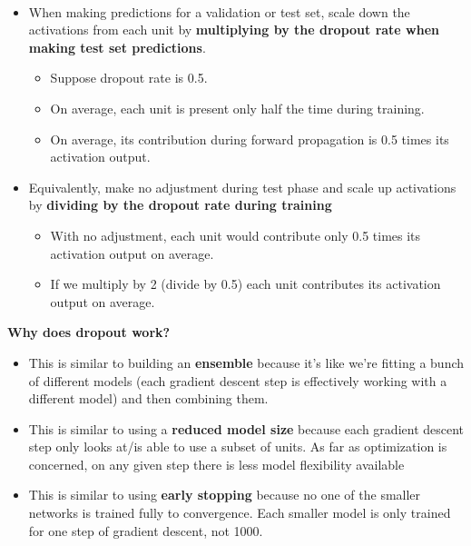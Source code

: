 \documentclass[11pt]{article}
\providecommand{\tightlist}{%
      \setlength{\itemsep}{0pt}\setlength{\parskip}{0pt}}
\begin{document}
    \begin{center}
    \end{center}
    { \hspace*{\fill} \\}
    
    \begin{itemize}
\tightlist
\item
  When making predictions for a validation or test set, scale down the
  activations from each unit by \textbf{multiplying by the dropout rate
  when making test set predictions}.

  \begin{itemize}
  \tightlist
  \item
    Suppose dropout rate is 0.5.
  \item
    On average, each unit is present only half the time during training.
  \item
    On average, its contribution during forward propagation is 0.5 times
    its activation output.
  \end{itemize}
\item
  Equivalently, make no adjustment during test phase and scale up
  activations by \textbf{dividing by the dropout rate during training}

  \begin{itemize}
  \tightlist
  \item
    With no adjustment, each unit would contribute only 0.5 times its
    activation output on average.
  \item
    If we multiply by 2 (divide by 0.5) each unit contributes its
    activation output on average.
  \end{itemize}
\end{itemize}

\newpage

\textbf{Why does dropout work?}

\begin{itemize}
 \item This is similar to building an
\textbf{ensemble} because it's like we're fitting a bunch of different
models (each gradient descent step is effectively working with a
different model) and then combining them.
\item This is similar to using a
\textbf{reduced model size} because each gradient descent step only
looks at/is able to use a subset of units. As far as optimization is
concerned, on any given step there is less model flexibility available
\item This is similar to using \textbf{early stopping} because no one of the
smaller networks is trained fully to convergence. Each smaller model is
only trained for one step of gradient descent, not 1000.
\end{itemize}
\end{document}
